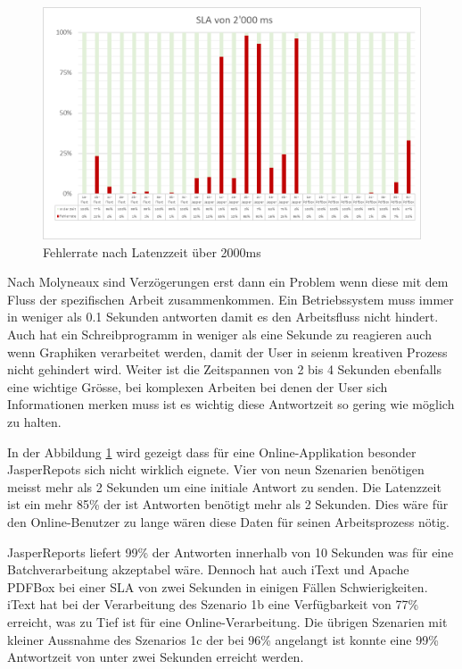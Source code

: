 \documentclass[main.tex]{subfiles}
\begin{document}
\begin{figure}[!ht]
\includegraphics[width=\textwidth]{mainpart/4_analyse_img/latencySLA2000.png}
 \caption{Fehlerrate nach Latenzzeit über 2000ms}
 \label{figure:latencySLA2000}
\end{figure}


Nach Molyneaux \cite[Kapitel~1]{molyneaux2014art} sind Verzögerungen erst dann ein Problem wenn diese mit dem Fluss der spezifischen Arbeit zusammenkommen. Ein Betriebssystem muss immer in weniger als 0.1 Sekunden antworten damit es den Arbeitsfluss nicht hindert. Auch hat ein Schreibprogramm in weniger als eine Sekunde zu reagieren auch wenn Graphiken verarbeitet werden, damit der User in seienm kreativen Prozess nicht gehindert wird. Weiter ist die Zeitspannen von 2 bis 4 Sekunden ebenfalls eine wichtige Grösse, bei komplexen Arbeiten bei denen der User sich Informationen merken muss ist es wichtig diese Antwortzeit so gering wie möglich zu halten. 

In der Abbildung \ref{figure:latencySLA2000} wird gezeigt dass für eine Online-Applikation besonder JasperRepots sich nicht wirklich eignete. Vier von neun Szenarien benötigen meisst mehr als 2 Sekunden um eine initiale Antwort zu senden. Die Latenzzeit ist ein mehr 85\% der ist Antworten benötigt mehr als 2 Sekunden. Dies wäre für den Online-Benutzer zu lange wären diese Daten für seinen Arbeitsprozess nötig.

JasperReports liefert 99\% der Antworten innerhalb von 10 Sekunden was für eine Batchverarbeitung akzeptabel wäre.
Dennoch hat auch iText und Apache PDFBox bei einer SLA von zwei Sekunden in einigen Fällen Schwierigkeiten. iText hat bei der Verarbeitung des Szenario 1b eine Verfügbarkeit von 77\% erreicht, was zu Tief ist für eine Online-Verarbeitung. Die übrigen Szenarien mit kleiner Aussnahme des Szenarios 1c der bei 96\%  angelangt ist konnte eine 99\% Antwortzeit von unter zwei Sekunden erreicht werden. 
\end{document}
